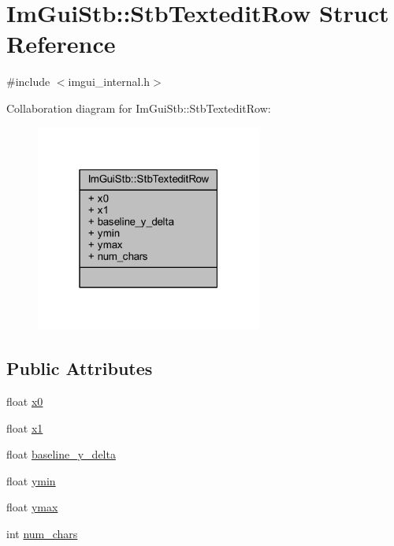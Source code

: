 \hypertarget{struct_im_gui_stb_1_1_stb_textedit_row}{}\section{Im\+Gui\+Stb\+:\+:Stb\+Textedit\+Row Struct Reference}
\label{struct_im_gui_stb_1_1_stb_textedit_row}


{\ttfamily \#include $<$imgui\+\_\+internal.\+h$>$}



Collaboration diagram for Im\+Gui\+Stb\+:\+:Stb\+Textedit\+Row\+:
\nopagebreak
\begin{figure}[H]
\begin{center}
\leavevmode
\includegraphics[width=211pt]{struct_im_gui_stb_1_1_stb_textedit_row__coll__graph}
\end{center}
\end{figure}
\subsection*{Public Attributes}
\begin{DoxyCompactItemize}
\item 
float \mbox{\hyperlink{struct_im_gui_stb_1_1_stb_textedit_row_a54de789c8fab0c5ad31582205b5ffc8a}{x0}}
\item 
float \mbox{\hyperlink{struct_im_gui_stb_1_1_stb_textedit_row_a53dcf8609e65440d8f16c6e531c21bc3}{x1}}
\item 
float \mbox{\hyperlink{struct_im_gui_stb_1_1_stb_textedit_row_a0a5d9561ecf2294b3341935f85b476a5}{baseline\+\_\+y\+\_\+delta}}
\item 
float \mbox{\hyperlink{struct_im_gui_stb_1_1_stb_textedit_row_a0c8be0676857e3a182ab73d1782e5da0}{ymin}}
\item 
float \mbox{\hyperlink{struct_im_gui_stb_1_1_stb_textedit_row_a24b4b9e6983914519d01335b4014a774}{ymax}}
\item 
int \mbox{\hyperlink{struct_im_gui_stb_1_1_stb_textedit_row_a7c8074c51d638753e44cb808fd5698ae}{num\+\_\+chars}}
\end{DoxyCompactItemize}


